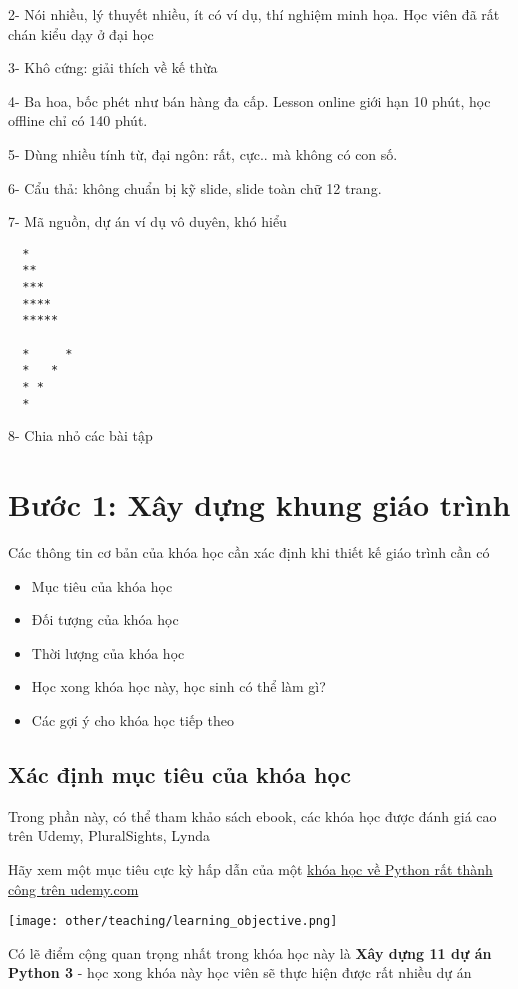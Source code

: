 2- Nói nhiều, lý thuyết nhiều, ít có ví dụ, thí nghiệm minh họa. Học viên đã rất chán kiểu dạy ở đại học

3- Khô cứng: giải thích về kế thừa

4- Ba hoa, bốc phét như bán hàng đa cấp. Lesson online giới hạn 10 phút, học offline chỉ có 140 phút.

5- Dùng nhiều tính từ, đại ngôn: rất, cực.. mà không có con số.

6- Cẩu thả: không chuẩn bị kỹ slide, slide toàn chữ 12 trang.

7- Mã nguồn, dự án ví dụ vô duyên, khó hiểu

\begin{lstlisting}
  *
  **
  ***
  ****
  *****

  *     *
  *   *
  * *
  *
\end{lstlisting}

8- Chia nhỏ các bài tập


\section{Bước 1: Xây dựng khung giáo trình}

Các thông tin cơ bản của khóa học cần xác định khi thiết kế giáo trình cần có

\begin{itemize}
  \item Mục tiêu của khóa học
  \item Đối tượng của khóa học
  \item Thời lượng của khóa học
  \item Học xong khóa học này, học sinh có thể làm gì?
  \item Các gợi ý cho khóa học tiếp theo
\end{itemize}

\subsection{Xác định mục tiêu của khóa học}

Trong phần này, có thể tham khảo sách ebook, các khóa học được đánh giá cao trên Udemy, PluralSights, Lynda

Hãy xem một mục tiêu cực kỳ hấp dẫn của một \href{https://www.udemy.com/the-python-bible/}{khóa học về Python rất thành công trên udemy.com}

\texttt{[image: other/teaching/learning\_objective.png]}

Có lẽ điểm cộng quan trọng nhất trong khóa học này là \textbf{Xây dựng 11 dự án Python 3} - học xong khóa này học viên sẽ thực hiện được rất nhiều dự án

